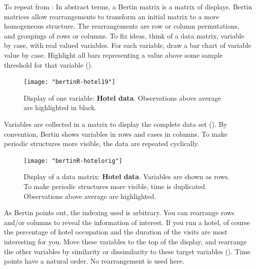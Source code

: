 \documentclass[nogin, dvips,12pt,a4paper,twoside]{amsart}
\begin{document}
To repeat from  \cite{seriation:Falguerolles:1997}: In abstract terms, a Bertin matrix is a matrix of displays. Bertin matrices allow rearrangements to
transform an initial matrix to a more homogeneous structure. The rearrangements are row or column
permutations, and groupings of rows or columns. To fix ideas, think of a data matrix, variable by
case, with real valued variables. For each variable, draw a bar chart of variable value by case. Highlight
all bars representing a value above some sample threshold for that variable ().


\begin{figure}[htbp]
\begin{center}
\texttt{[image: "bertinR-hotel19"]}
\caption{Display of one variable: \textbf{Hotel data}.  Observations above average are highlighted in black.}
\label{fig:hotel19}
\end{center}
\end{figure}

Variables are collected in a matrix to display the complete data set (). By convention, Bertin shows variables in rows and cases in columns. To make periodic structures more visible, the data are  repeated cyclically.


\begin{figure}[htbp]
\begin{center}
\texttt{[image: "bertinR-hotelorig"]}
\caption{Display of a data matrix: \textbf{Hotel data}. Variables are shown as rows. To make periodic structures more visible, time is duplicated. Observations above average are highlighted.}
\label{fig:hotelorig}
\end{center}
\end{figure}

As Bertin points out, the indexing used is arbitrary. You can rearrange rows and/or columns to reveal the information of interest. If you run a hotel, of course the percentage of hotel occupation and the duration of the visits are most interesting for you. Move these variables to the top of the display, and rearrange the other variables by similarity or dissimilarity to these target variables (). Time points have a natural order. No rearrangement is used here.

\end{document}
